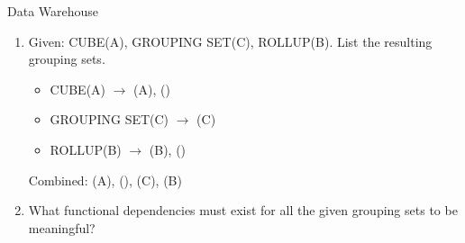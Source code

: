 \documentclass{article}
\begin{document}
\begin{exercise}{Data Warehouse}
\begin{enumerate}
    \item Given: CUBE(A), GROUPING SET(C), ROLLUP(B). List the resulting grouping sets. \begin{solution}
        \begin{itemize}
          \item CUBE(A) $\rightarrow$ (A), ()
          \item GROUPING SET(C) $\rightarrow$ (C)
          \item ROLLUP(B) $\rightarrow$ (B), ()
        \end{itemize}
        Combined: (A), (), (C), (B)
      \end{solution}

    \item What functional dependencies must exist for all the given grouping sets to be meaningful? 
  \end{enumerate}
\end{exercise}
\end{document}
